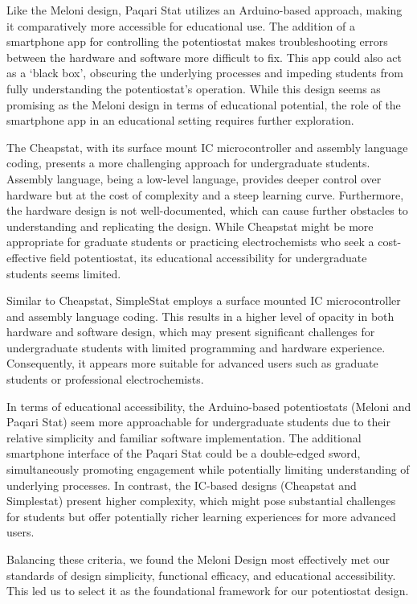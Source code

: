 \documentclass{article}
\begin{document}
Like the Meloni design, Paqari Stat utilizes an Arduino-based approach, making it comparatively more accessible for educational use. The addition of a smartphone app for controlling the potentiostat makes troubleshooting errors between the hardware and software more difficult to fix. This app could also act as a `black box', obscuring the underlying processes and impeding students from fully understanding the potentiostat's operation. While this design seems as promising as the Meloni design in terms of educational potential, the role of the smartphone app in an educational setting requires further exploration.


The Cheapstat, with its surface mount IC microcontroller and assembly language coding, presents a more challenging approach for undergraduate students. Assembly language, being a low-level language, provides deeper control over hardware but at the cost of complexity and a steep learning curve. Furthermore, the hardware design is not well-documented, which can cause further obstacles to understanding and replicating the design. While Cheapstat might be more appropriate for graduate students or practicing electrochemists who seek a cost-effective field potentiostat, its educational accessibility for undergraduate students seems limited.


Similar to Cheapstat, SimpleStat employs a surface mounted IC microcontroller and assembly language coding. This results in a higher level of opacity in both hardware and software design, which may present significant challenges for undergraduate students with limited programming and hardware experience. Consequently, it appears more suitable for advanced users such as graduate students or professional electrochemists.


In terms of educational accessibility, the Arduino-based potentiostats (Meloni and Paqari Stat) seem more approachable for undergraduate students due to their relative simplicity and familiar software implementation. The additional smartphone interface of the Paqari Stat could be a double-edged sword, simultaneously promoting engagement while potentially limiting understanding of underlying processes. In contrast, the IC-based designs (Cheapstat and Simplestat) present higher complexity, which might pose substantial challenges for students but offer potentially richer learning experiences for more advanced users.


Balancing these criteria, we found the Meloni Design most effectively met our standards of design simplicity, functional efficacy, and educational accessibility. This led us to select it as the foundational framework for our potentiostat design.
\end{document}
